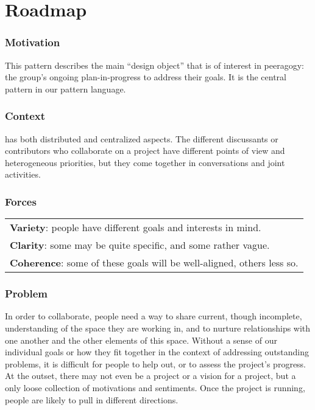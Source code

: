 \section{Roadmap} \label{sec:Roadmap}



\subsubsection*{Motivation} This pattern describes the main ``design object'' that is of interest in peeragogy: the group's ongoing plan-in-progress to address their goals.  It is the central pattern in our pattern language. 


\subsubsection*{Context}  has both distributed and centralized aspects. The different discussants or contributors who collaborate on a project have different points of view and heterogeneous priorities, but they come together in conversations and joint activities.

\subsubsection*{Forces}
\raisebox{-1\baselineskip}
{{\centering
\begin{tabular}{p{}}
\textbf{Variety}: people have different goals and interests in mind.\\
\textbf{Clarity}: some may be quite specific, and some rather vague.\\
\textbf{Coherence}: some of these goals will be well-aligned, others less so.
\end{tabular}
}}

\subsubsection*{Problem} In order to collaborate, people need a way to share current, though incomplete, understanding of the space they are working in, and to nurture relationships with one another and the other elements of this space.  Without a sense of our individual goals or how they fit together in the context of addressing outstanding problems, it is difficult for people to help out, or to assess the 
project's progress.  At the outset, there may not even be a project or a vision for a project, but a only loose collection of motivations and sentiments.  Once the project is running, people are likely to pull in different directions.   

